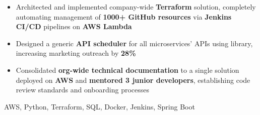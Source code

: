 \begin{experiences}
{\begin{itemize}
                        \item Architected and implemented company-wide \textbf{Terraform} solution, completely automating management of \textbf{1000+ GitHub resources} via \textbf{Jenkins CI/CD} pipelines on \textbf{AWS Lambda}

                        \item Designed a generic \textbf{API scheduler} for all microservices' APIs using  library, increasing marketing outreach by \textbf{28\%}
                        
                        \item Consolidated \textbf{org-wide technical documentation} to a single  solution deployed on \textbf{AWS} and \textbf{mentored 3 junior developers}, establishing code review standards and onboarding processes
                    \end{itemize}
                    }
                    {AWS, Python, Terraform, SQL, Docker, Jenkins, Spring Boot}
\end{experiences}
